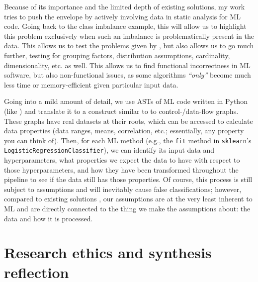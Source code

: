     Because of its importance and the limited depth of existing solutions, my work \citep{meijer_contract_2024} tries to push the envelope by actively involving data in static analysis for ML code.
    Going back to the class imbalance example, this will allow us to highlight this problem exclusively when such an imbalance is problematically present in the data.
    This allows us to test the problems given by \citet{recupito2024unmasking}, but also allows us to go much further, testing for grouping factors, distribution assumptions, cardinality, dimensionality, etc. as well.
    This allows us to find functional incorrectness in ML software, but also non-functional issues, as some algorithms \textit{``only''} become much less time or memory-efficient given particular input data.

    Going into a mild amount of detail, we use ASTs of ML code written in Python (like \citet{shivashankar2025mlscent}) and translate it to a construct similar to to control-/data-flow graphs.
    These graphs have real datasets at their roots, which can be accessed to calculate data properties (data ranges, means, correlation, etc.; essentially, any property you can think of).
    Then, for each ML method (e.g., the \texttt{fit} method in \texttt{sklearn}'s \texttt{LogisticRegressionClassifier}), we can identify its input data and hyperparameters, what properties we expect the data to have with respect to those hyperparameters, and how they have been transformed throughout the pipeline to see if the data still has those properties.
    Of course, this process is still subject to assumptions and will inevitably cause false classifications; however, compared to existing solutions \citep{shivashankar2025mlscent, quaranta2024pynblint}, our assumptions are at the very least inherent to ML and are directly connected to the thing we make the assumptions about: the data and how it is processed.
    

\section*{Research ethics and synthesis reflection}


